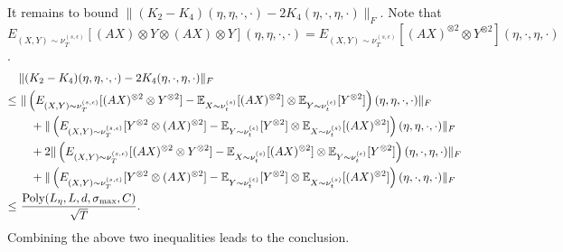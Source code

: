 It remains to bound $\|(K_2-K_4)(\eta,\eta,\cdot, \cdot) - 2K_4(\eta,\cdot,\eta,\cdot)\|_F$. 
Note that $E_{(X,Y)\sim \nu_T^{(s,\epsilon)}} [ (AX)\otimes Y\otimes (AX)\otimes Y](\eta,\eta,\cdot,\cdot)  = E_{(X,Y)\sim \nu_T^{(s,\epsilon)}} [ (AX)^{\otimes 2}\otimes Y^{\otimes 2}](\eta,\cdot,\eta,\cdot)$.
\begin{align*}
& \|(K_2-K_4)(\eta,\eta,\cdot, \cdot) - 2K_4(\eta,\cdot,\eta,\cdot)\|_F \\
\le\,  & \,\|\left( E_{(X,Y)\sim \nu_T^{(s,\epsilon)}} [ (AX)^{\otimes 2}\otimes Y^{\otimes 2}]- \mathbb{E}_{X\sim \nu_t^{(s)}}[(AX)^{\otimes 2}] \otimes \mathbb{E}_{Y\sim \nu_t^{(\epsilon)}}[Y^{\otimes 2}]\right)(\eta,\eta,\cdot,\cdot)\|_F \\
& \quad + \|\left( E_{(X,Y)\sim \nu_T^{(s,\epsilon)}} [ Y^{\otimes 2}\otimes (AX)^{\otimes 2}]- \mathbb{E}_{Y\sim \nu_t^{(\epsilon)}}[Y^{\otimes 2}] \otimes \mathbb{E}_{X\sim \nu_t^{(s)}}[(AX)^{\otimes 2}]\right)(\eta,\eta,\cdot,\cdot)\|_F \\
& \quad + 2\|\left( E_{(X,Y)\sim \nu_T^{(s,\epsilon)}} [ (AX)^{\otimes 2}\otimes Y^{\otimes 2}]- \mathbb{E}_{X\sim \nu_t^{(s)}}[(AX)^{\otimes 2}] \otimes \mathbb{E}_{Y\sim \nu_t^{(\epsilon)}}[Y^{\otimes 2}]\right)(\eta,\cdot,\eta,\cdot)\|_F \\
& \quad + \|\left( E_{(X,Y)\sim \nu_T^{(s,\epsilon)}} [ Y^{\otimes 2}\otimes (AX)^{\otimes 2}]- \mathbb{E}_{Y\sim \nu_t^{(\epsilon)}}[Y^{\otimes 2}] \otimes \mathbb{E}_{X\sim \nu_t^{(s)}}[(AX)^{\otimes 2}]\right)(\eta,\cdot,\eta, \cdot)\|_F \\
\le \, &\, \frac{\text{Poly}(L_{\eta}, L, d, \sigma_{\max}, C)}{\sqrt{T}}. 
\end{align*}
Combining the above two inequalities leads to the conclusion.



